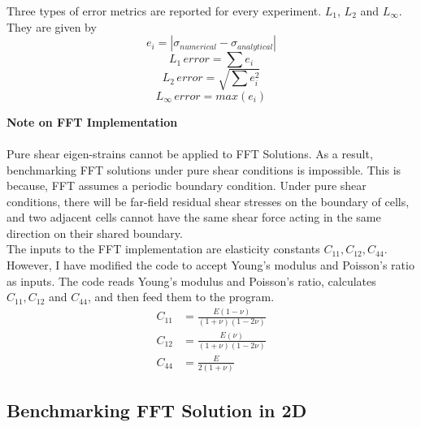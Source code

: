 \documentclass[12pt, a4paper]{report}
\begin{document}
Three types of error metrics are reported for every experiment. $L_1$, $L_2$ and $L_\infty$. They are given by
\begin{equation}
    e_i = \left| \sigma_{numerical} - \sigma_{analytical}\right|
\end{equation}
\begin{equation}
    L_{1}\,  error = \sum e_i
\end{equation}
\begin{equation}
    L_{2}\,  error = \sqrt{\sum e_{i}^{2}}
\end{equation}
\begin{equation}
    L_{\infty}\,  error = max(e_i)
\end{equation}

\textbf{Note on FFT Implementation}
\paragraph{}
Pure shear eigen-strains cannot be applied to FFT Solutions. As a result, benchmarking FFT solutions under pure shear conditions is impossible. This is because, FFT assumes a periodic boundary condition. Under pure shear conditions, there will be far-field residual shear stresses on the boundary of cells, and two adjacent cells cannot have the same shear force acting in the same direction on their shared boundary. \\

The inputs to the FFT implementation are elasticity constants $C_{11}, C_{12}, C_{44}$. However, I have modified the code to accept Young's modulus and Poisson's ratio as inputs. The code reads Young's modulus and Poisson's ratio, calculates $C_{11}, C_{12}$ and $C_{44}$, and then feed them to the program.
\begin{align}
    C_{11} &= \frac{E(1-\nu)}{(1+\nu)(1-2\nu)} \nonumber \\
    C_{12} &= \frac{E(\nu)}{(1+\nu)(1-2\nu)} \nonumber \\
    C_{44} &= \frac{E}{2(1+\nu)}
\end{align}

\newpage
\subsection{Benchmarking FFT Solution in 2D}
\end{document}
